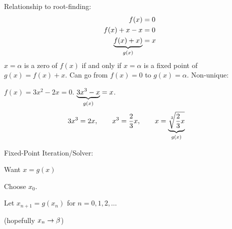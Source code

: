 \documentclass[]{article}
\begin{document}
Relationship to root-finding:
\begin{align*}
	f(x) &=0 \\
	f(x)+x-x &= 0 \\
	\ub{g(x)}{f(x)+x)} &= x
\end{align*}
$x=\alpha$ is a zero of $f(x)$ if and only if $x=\alpha$ is a fixed point of $g(x) = f(x)+x$.
Can go from $f(x)=0$ to $g(x)=\alpha$.
Non-unique:
\begin{example}
	$f(x) = 3x^2-2x=0$. $\ub{g(x)}{3x^3-x}=x$.
	\begin{align*}
		3x^3 &= 2x, \qquad
		x^3 = \frac23x, \qquad
		x = \ub{g(x)}{\nrt3{\frac23x}}
	\end{align*}
\end{example}

Fixed-Point Iteration/Solver:

Want $x=g(x)$

Choose $x_0$.

Let $x_{n+1} = g(x_n)$ for $n=0,1,2,\dots$

(hopefully $x_n\ra\beta$)
\end{document}
